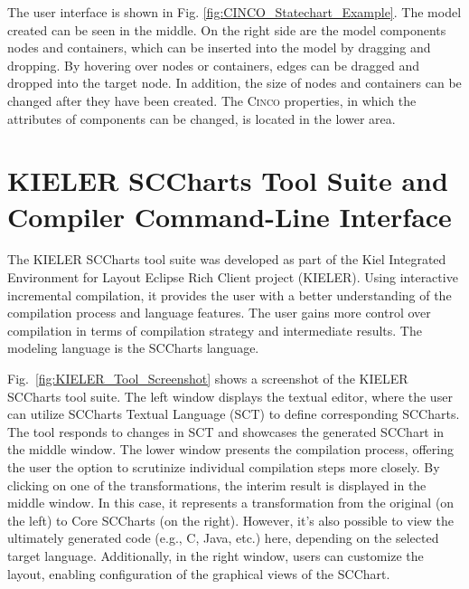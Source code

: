 The user interface is shown in Fig. \ref{fig:CINCO_Statechart_Example}. The model created can be seen in the middle. On the right side are the model components nodes and containers, which can be inserted into the model by dragging and dropping. By hovering over nodes or containers, edges can be dragged and dropped into the target node. In addition, the size of nodes and containers can be changed after they have been created. The \textsc{Cinco} properties, in which the attributes of components can be changed, is located in the lower area.

\section{KIELER SCCharts Tool Suite and Compiler Command-Line Interface}\label{Kieler}
The KIELER SCCharts tool suite was developed as part of the Kiel Integrated Environment for Layout Eclipse Rich Client project (KIELER). Using interactive incremental compilation, it provides the user with a better understanding of the compilation process and language features. The user gains more control over compilation in terms of compilation strategy and intermediate results. The modeling language is the SCCharts language.~\cite{Motika.2017}

Fig.~\ref{fig:KIELER_Tool_Screenshot} shows a screenshot of the KIELER SCCharts tool suite. The left window displays the textual editor, where the user can utilize SCCharts Textual Language (SCT) to define corresponding SCCharts. The tool responds to changes in SCT and showcases the generated SCChart in the middle window. The lower window presents the compilation process, offering the user the option to scrutinize individual compilation steps more closely. By clicking on one of the transformations, the interim result is displayed in the middle window. In this case, it represents a transformation from the original (on the left) to Core SCCharts (on the right). However, it's also possible to view the ultimately generated code (e.g., C, Java, etc.) here, depending on the selected target language. Additionally, in the right window, users can customize the layout, enabling configuration of the graphical views of the SCChart.~\cite{Motika.2017}

